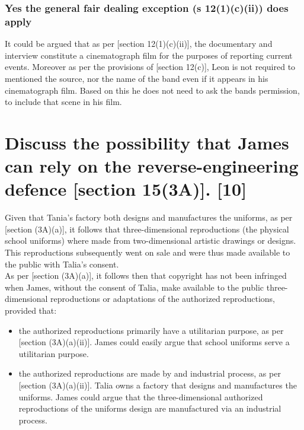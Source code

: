 \documentclass[11pt]{article}
\begin{document}
\subsubsection{Yes the general fair dealing exception (s 12(1)(c)(ii)) does apply}
\label{sec:org96cf70f}
It could be argued that as per [section 12(1)(c)(ii)]\cite{rsa78_copyrightact}, the
documentary and interview constitute a cinematograph film for the purposes of
reporting current events. Moreover as per the provisions of [section
12(c)]\cite{rsa78_copyrightact}, Leon is not required to mentioned the source, nor
the name of the band even if it appears in his cinematograph film. Based on this
he does not need to ask the bands permission, to include that scene in his film.

\section{Discuss the possibility that James can rely on the reverse-engineering defence [section 15(3A)]\cite{wipo96_copyright_treaty}. [10]}
\label{sec:orgf080bbf}
Given that Tania's factory both designs and manufactures the uniforms, as per [section (3A)(a)]\cite{rsa78_copyrightact},
it follows that three-dimensional reproductions (the physical school uniforms) where made from two-dimensional artistic
drawings or designs. This reproductions subsequently went on sale and were thus made available to the public with
Talia's consent.\\

As per [section (3A)(a)]\cite{rsa78_copyrightact}, it follows then that copyright has not been infringed when James,
without the consent of Talia, make available to the public three-dimensional reproductions or adaptations of the
authorized reproductions, provided that:
\begin{itemize}
\item the authorized reproductions primarily have a utilitarian purpose, as per [section
(3A)(a)(ii)]\cite{rsa78_copyrightact}. James could easily argue that school uniforms serve a utilitarian purpose.
\item the authorized reproductions are made by and industrial process, as per [section
(3A)(a)(ii)]\cite{rsa78_copyrightact}. Talia owns a factory that designs and manufactures the uniforms. James could
argue that the three-dimensional authorized reproductions of the uniforms design are manufactured via an industrial process.
\end{itemize}
\end{document}
